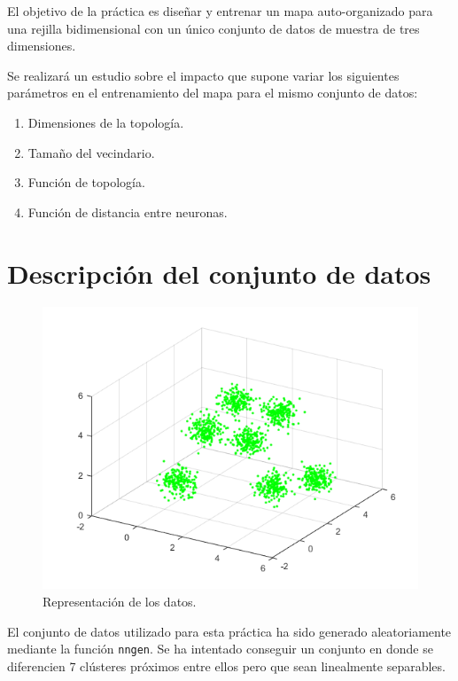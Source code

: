 \documentclass[a4paper,12pt,titlepage]{article}
\begin{document}
El objetivo de la práctica es diseñar y entrenar un mapa auto-organizado para una rejilla bidimensional con un único conjunto de datos de muestra de tres dimensiones. 

Se realizará un estudio sobre el impacto que supone variar los siguientes parámetros en el entrenamiento del mapa para el mismo conjunto de datos:

\begin{enumerate}[noitemsep]
	\item Dimensiones de la topología.
	\item Tamaño del vecindario.
	\item Función de topología.
	\item Función de distancia entre neuronas.
\end{enumerate}

\section{Descripción del conjunto de datos}

\begin{figure}[!ht]
	\centering
	\label{fig:data}
	\includegraphics[width=\textwidth]{datos.png}
	\caption{Representación de los datos.}
\end{figure}

El conjunto de datos utilizado para esta práctica ha sido generado aleatoriamente mediante la función \lstinline|nngen|. Se ha intentado conseguir un conjunto en donde se diferencien 7 clústeres próximos entre ellos pero que sean linealmente separables.
\end{document}
